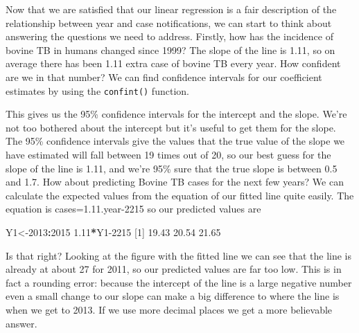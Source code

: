 \documentclass[
]{book}
\newenvironment{Shaded}{\begin{snugshade}}{\end{snugshade}}
\newcommand{\DecValTok}[1]{\textcolor[rgb]{0.00,0.00,0.81}{#1}}
\newcommand{\FloatTok}[1]{\textcolor[rgb]{0.00,0.00,0.81}{#1}}
\newcommand{\KeywordTok}[1]{\textcolor[rgb]{0.13,0.29,0.53}{\textbf{#1}}}
\newcommand{\NormalTok}[1]{#1}
\newcommand{\OperatorTok}[1]{\textcolor[rgb]{0.81,0.36,0.00}{\textbf{#1}}}
\begin{document}
Now that we are satisfied that our linear regression is a fair description of the relationship between year and case notifications, we can start to think about answering the questions we need to address. Firstly, how has the incidence of bovine TB in humans changed since 1999? The slope of the line is 1.11, so on average there has been 1.11 extra case of bovine TB every year. How confident are we in that number? We can find confidence intervals for our coefficient estimates by using the \texttt{confint()} function.

\begin{Shaded}
\end{Shaded}

This gives us the 95\% confidence intervals for the intercept and the slope. We're not too bothered about the intercept but it's useful to get them for the slope. The 95\% confidence intervals give the values that the true value of the slope we have estimated will fall between 19 times out of 20, so our best guess for the slope of the line is 1.11, and we're 95\% sure that the true slope is between 0.5 and 1.7.
How about predicting Bovine TB cases for the next few years? We can calculate the expected values from the equation of our fitted line quite easily. The equation is cases=1.11.year-2215 so our predicted values are

\begin{Shaded}
\begin{Highlighting}[]
\NormalTok{Y1<-}\DecValTok{2013}\OperatorTok{:}\DecValTok{2015}
\FloatTok{1.11}\OperatorTok{*}\NormalTok{Y1}\DecValTok{-2215}
\NormalTok{[}\DecValTok{1}\NormalTok{] }\FloatTok{19.43} \FloatTok{20.54} \FloatTok{21.65}
\end{Highlighting}
\end{Shaded}

Is that right? Looking at the figure with the fitted line we can see that the line is already at about 27 for 2011, so our predicted values are far too low. This is in fact a rounding error: because the intercept of the line is a large negative number even a small change to our slope can make a big difference to where the line is when we get to 2013. If we use more decimal places we get a more believable answer.
\end{document}
